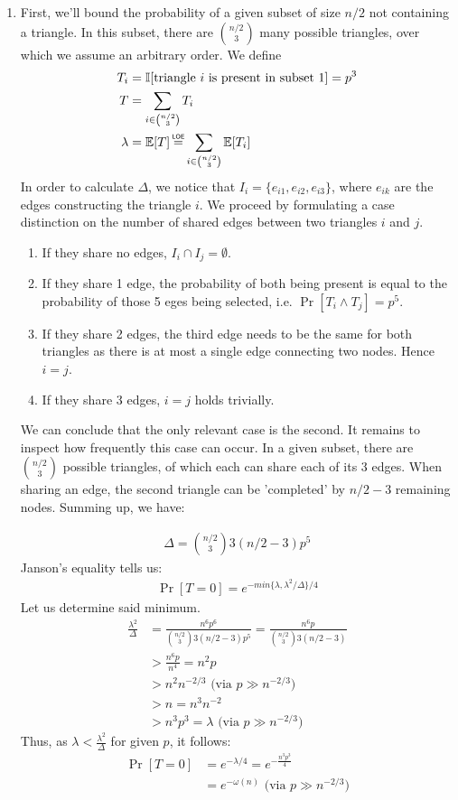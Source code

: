 \documentclass[a4paper,german]{article}
\newcommand\loe{\mathrel{\overset{\makebox[0pt]{\mbox{\normalfont\tiny\sffamily LOE}}}{=}}}
\newcommand{\E}{\mathbb{E}}
\begin{document}
\begin{enumerate}
\item
First, we'll bound the probability of a given subset of size \(n/2\) not containing a triangle. In this subset, there are \( {n/2 \choose 3}\) many possible triangles, over which we assume an arbitrary order. We define 
\begin{align*} 
T_i &= \mathbb{I} [\text{triangle } i \text{ is present in subset } 1] = p^3 \\
T &= \sum_{i \in {n/2 \choose 3}} T_i \\
\lambda &= \E[T] \loe \sum_{i \in {n/2 \choose 3}} \E[T_i]
\end{align*}
In order to calculate \(\Delta\), we notice that \(I_i = \{e_{i1}, e_{i2}, e_{i3} \}\), where \(e_{ik}\) are the edges constructing the triangle \(i\). We proceed by formulating a case distinction on the number of shared edges between two triangles \(i\) and \(j\).
\begin{enumerate}
\item If  they share no edges, \(I_i \cap I_j = \emptyset \).
\item If they share 1 edge, the probability of both being present is equal to the probability of those 5 eges being selected, i.e. \(\Pr[T_i \wedge T_j] = p^5\).
\item If they share 2 edges, the third edge needs to be the same for both triangles as there is at most a single edge connecting two nodes. Hence \(i = j\).
\item If they share 3 edges, \(i = j\) holds trivially. 
\end{enumerate}
We can conclude that the only relevant case is the second. It remains to inspect how frequently this case can occur. In a given subset, there are \( {n/2 \choose 3} \) possible triangles, of which each can share each of its 3 edges. When sharing an edge, the second triangle can be 'completed' by \(n/2 -3\) remaining nodes. Summing up, we have:

\begin{align*}
\Delta = {n/2 \choose 3}3(n/2 -3) p^5
\end{align*}
Janson's equality tells us:
\begin{align*}
\Pr[T = 0] = e^{- min\{\lambda, \lambda^2 / \Delta\} /4} 
\end{align*}
Let us determine said minimum.
\begin{align*}
\frac{\lambda^2}{\Delta} &= \frac{n^6 p^6}{ {n/2 \choose 3}3(n/2 -3) p^5} = \frac{n^6 p}{ {n/2 \choose 3}3(n/2 -3)} \\
&> \frac{n^6p}{n^4} = n^2p \\
&> n^2 n^{-2/3} \text{     (via } p\gg n^{-2/3} \text{)} \\
&> n = n^3 n^{-2} \\
&> n^3 p^3 = \lambda  \text{     (via } p\gg n^{-2/3} \text{)}
\end{align*}
Thus, as \( \lambda < \frac{\lambda^2}{\Delta}\) for given \(p\), it follows:
\begin{align*}
\Pr[T = 0] &= e^{-\lambda/4} = e^{-\frac{n^3p^3}{4}} \\
&= e^{-\omega(n)}    \text{     (via } p\gg n^{-2/3} \text{)}
\end{align*}


\end{enumerate}
\end{document}
